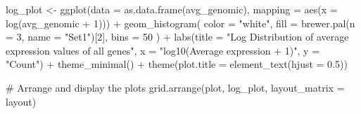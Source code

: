 \documentclass[
  letterpaper,
  DIV=11,
  numbers=noendperiod]{scrartcl}
\newenvironment{Shaded}{\begin{snugshade}}{\end{snugshade}}
\newcommand{\AttributeTok}[1]{\textcolor[rgb]{0.40,0.45,0.13}{#1}}
\newcommand{\CommentTok}[1]{\textcolor[rgb]{0.37,0.37,0.37}{#1}}
\newcommand{\DecValTok}[1]{\textcolor[rgb]{0.68,0.00,0.00}{#1}}
\newcommand{\FloatTok}[1]{\textcolor[rgb]{0.68,0.00,0.00}{#1}}
\newcommand{\FunctionTok}[1]{\textcolor[rgb]{0.28,0.35,0.67}{#1}}
\newcommand{\NormalTok}[1]{\textcolor[rgb]{0.00,0.23,0.31}{#1}}
\newcommand{\OtherTok}[1]{\textcolor[rgb]{0.00,0.23,0.31}{#1}}
\newcommand{\SpecialCharTok}[1]{\textcolor[rgb]{0.37,0.37,0.37}{#1}}
\newcommand{\StringTok}[1]{\textcolor[rgb]{0.13,0.47,0.30}{#1}}
\begin{document}
\begin{Shaded}
\begin{Highlighting}[]
\NormalTok{log\_plot }\OtherTok{\textless{}{-}} \FunctionTok{ggplot}\NormalTok{(}\AttributeTok{data =} \FunctionTok{as.data.frame}\NormalTok{(avg\_genomic), }\AttributeTok{mapping =} \FunctionTok{aes}\NormalTok{(}\AttributeTok{x =} \FunctionTok{log}\NormalTok{(avg\_genomic }\SpecialCharTok{+} \DecValTok{1}\NormalTok{))) }\SpecialCharTok{+}
  \FunctionTok{geom\_histogram}\NormalTok{(}
    \AttributeTok{color =} \StringTok{"white"}\NormalTok{,}
    \AttributeTok{fill =} \FunctionTok{brewer.pal}\NormalTok{(}\AttributeTok{n =} \DecValTok{3}\NormalTok{, }\AttributeTok{name =} \StringTok{"Set1"}\NormalTok{)[}\DecValTok{2}\NormalTok{],}
    \AttributeTok{bins =} \DecValTok{50}
\NormalTok{  ) }\SpecialCharTok{+}
  \FunctionTok{labs}\NormalTok{(}\AttributeTok{title =} \StringTok{"Log Distribution of average expression values of all genes"}\NormalTok{,}
       \AttributeTok{x =} \StringTok{"log10(Average expression + 1)"}\NormalTok{,}
       \AttributeTok{y =} \StringTok{"Count"}\NormalTok{) }\SpecialCharTok{+}
  \FunctionTok{theme\_minimal}\NormalTok{() }\SpecialCharTok{+}
  \FunctionTok{theme}\NormalTok{(}\AttributeTok{plot.title =} \FunctionTok{element\_text}\NormalTok{(}\AttributeTok{hjust =} \FloatTok{0.5}\NormalTok{))}

\CommentTok{\# Arrange and display the plots}
\FunctionTok{grid.arrange}\NormalTok{(plot, log\_plot, }\AttributeTok{layout\_matrix =}\NormalTok{ layout)}
\end{Highlighting}
\end{Shaded}
\end{document}
